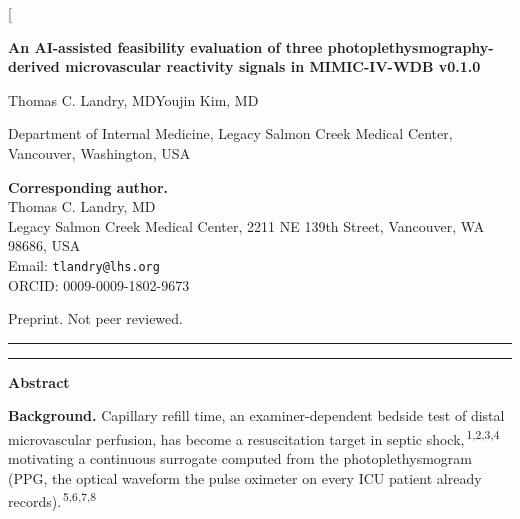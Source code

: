 \documentclass[twocolumn,letterpaper,10pt]{article}
\renewcommand{\cite}[1]{\textsuperscript{\,#1}}
\newcommand{\accenttitlerule}{%
  {\color{accent}\rule{\textwidth}{1.1pt}}\par\vspace{2pt}%
  {\color{accent}\rule{\textwidth}{0.4pt}}\par}
\begin{document}
\twocolumn[%
  \begin{center}
    {\sffamily\bfseries\color{accent}\LARGE
     An AI-assisted feasibility evaluation of three photoplethysmography-derived microvascular reactivity signals in MIMIC-IV-WDB v0.1.0\par}
    \vspace{0.9em}
    {\large Thomas C. Landry, MD\quad Youjin Kim, MD\par}
    \vspace{0.5em}
    {\small Department of Internal Medicine, Legacy Salmon Creek Medical Center, Vancouver, Washington, USA\par}
    \vspace{0.25em}
    {\small\textbf{Corresponding author.}\\
     Thomas C. Landry, MD\\
     Legacy Salmon Creek Medical Center, 2211 NE 139th Street, Vancouver, WA 98686, USA\\
     Email: \texttt{tlandry@lhs.org}\\
     ORCID: 0009-0009-1802-9673\par}
    \vspace{0.35em}
    {\small Preprint. Not peer reviewed.\par}
  \end{center}
  \vspace{0.4em}
  \accenttitlerule
  \vspace{0.6em}
  {\sffamily\bfseries\large\color{accent}Abstract\par}
  \vspace{0.3em}
  \begingroup\small\raggedright
  \setlength{\parindent}{0pt}\setlength{\parskip}{0.5em}

  \textbf{Background.} Capillary refill time, an examiner-dependent bedside test of distal microvascular perfusion, has become a resuscitation target in septic shock,\cite{1,2,3,4} motivating a continuous surrogate computed from the photoplethysmogram (PPG, the optical waveform the pulse oximeter on every ICU patient already records).\cite{5,6,7,8}
\end{document}
